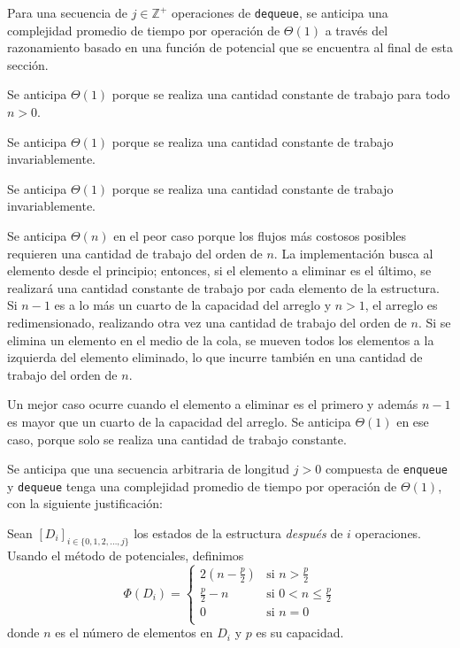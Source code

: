 \begin{description}
{		Para una secuencia de $j \in \mathbb{Z}^{+}$ operaciones de \texttt{dequeue}, se anticipa una complejidad promedio de tiempo por operación de $\Theta{}(1)$ a través del razonamiento basado en una función de potencial que se encuentra al final de esta sección.
	}
	\item[front]{
		Se anticipa $\Theta{}(1)$ porque se realiza una cantidad constante de trabajo para todo $n > 0$.
	}
	\item[isEmpty]{
		Se anticipa $\Theta{}(1)$ porque se realiza una cantidad constante de trabajo invariablemente.
	}
	\item[size]{
		Se anticipa $\Theta{}(1)$ porque se realiza una cantidad constante de trabajo invariablemente.
	}
	\item[delete]{
		Se anticipa $\Theta{}(n)$ en el peor caso porque los flujos más costosos posibles requieren una cantidad de trabajo del orden de $n$. La implementación busca al elemento desde el principio; entonces, si el elemento a eliminar es el último, se realizará una cantidad constante de trabajo por cada elemento de la estructura. Si $n - 1$ es a lo más un cuarto de la capacidad del arreglo y $n > 1$, el arreglo es redimensionado, realizando otra vez una cantidad de trabajo del orden de $n$. Si se elimina un elemento en el medio de la cola, se mueven todos los elementos a la izquierda del elemento eliminado, lo que incurre también en una cantidad de trabajo del orden de $n$.

		Un mejor caso ocurre cuando el elemento a eliminar es el primero y además $n - 1$ es mayor que un cuarto de la capacidad del arreglo. Se anticipa $\Theta{}(1)$ en ese caso, porque solo se realiza una cantidad de trabajo constante.
	}
\end{description}

Se anticipa que una secuencia arbitraria de longitud $j > 0$ compuesta de \texttt{enqueue} y \texttt{dequeue} tenga una complejidad promedio de tiempo por operación de $\Theta{} (1)$, con la siguiente justificación:

Sean $\left[D_i\right]_{i \in \{ 0, 1, 2, \dots, j\}}$ los estados de la estructura \emph{después} de $i$ operaciones. Usando el método de potenciales, definimos
$$
	\Phi{}(D_i) = \begin{cases}
		2\left(n - \frac{p}{2}\right) & \text{si } n > \frac{p}{2} \\
		\frac{p}{2} - n & \text{si } 0 < n \le \frac{p}{2} \\
		0 & \text{si } n = 0 \\
	\end{cases}
$$
donde $n$ es el número de elementos en $D_i$ y $p$ es su capacidad.

